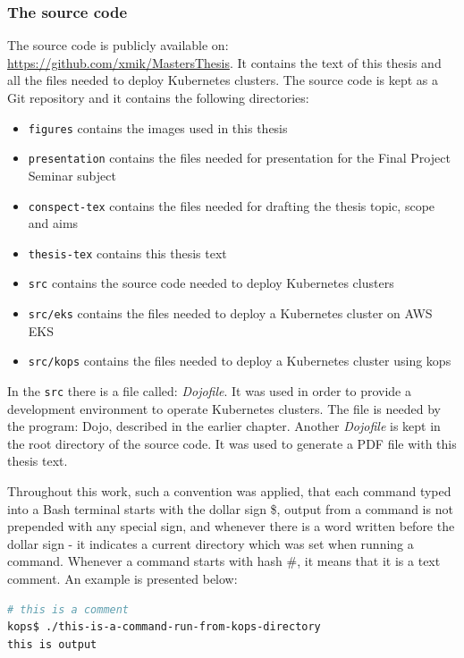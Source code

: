 \subsubsection{The source code}
\label{5-sc}
The source code is publicly available on: \url{https://github.com/xmik/MastersThesis}. It contains the text of this thesis and all the files needed to deploy Kubernetes clusters. The source code is kept as a Git repository and it contains the following directories:
\begin{itemize}
\item \verb|figures| contains the images used in this thesis
\item \verb|presentation| contains the files needed for presentation for the Final Project Seminar subject
\item \verb|conspect-tex| contains the files needed for drafting the thesis topic, scope and aims
\item \verb|thesis-tex| contains this thesis text
\item \verb|src| contains the source code needed to deploy Kubernetes clusters
\item \verb|src/eks| contains the files needed to deploy a Kubernetes cluster on AWS EKS
\item \verb|src/kops| contains the files needed to deploy a Kubernetes cluster using kops
\end{itemize}

In the \verb|src| there is a file called: \textit{Dojofile}. It was used in order to provide a development environment to operate Kubernetes clusters. The file is needed by the program: Dojo, described in the earlier chapter. Another \textit{Dojofile} is kept in the root directory of the source code. It was used to generate a PDF file with this thesis text.

Throughout this work, such a convention was applied, that each command typed into a Bash terminal starts with the dollar sign \$, output from a command is not prepended with any special sign, and whenever there is a word written before the dollar sign - it indicates a current directory which was set when running a command. Whenever a command starts with hash \#, it means that it is a text comment. An example is presented below:
\begin{lstlisting}[basicstyle=\tiny,caption={An example code listing explaining the format},captionpos=b,language=Bash,xleftmargin=1cm]
# this is a comment
kops$ ./this-is-a-command-run-from-kops-directory
this is output
\end{lstlisting}

